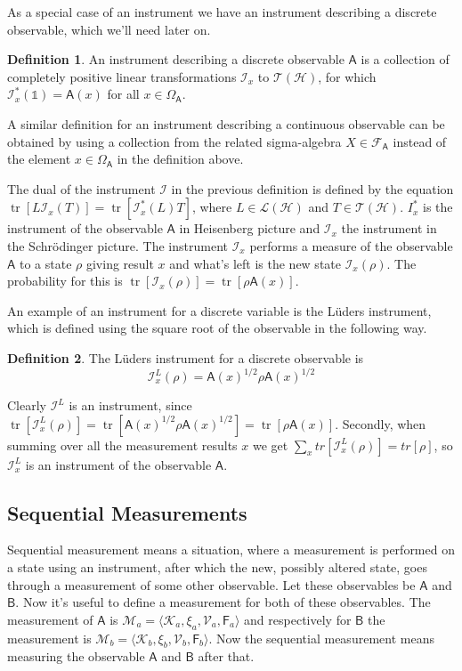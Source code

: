 \documentclass[a4paper,12pt]{wihuri}
\theoremstyle{definition}
\newtheorem{definition}{Definition}
\numberwithin{definition}{section}
\numberwithin{example}{section}
\numberwithin{theorem}{section}
\numberwithin{proposition}{section}
\numberwithin{lemma}{section}
\newcommand{\I}{\mathcal{I}}%
\newcommand{\hi}{\mathcal{H}}%
\newcommand{\ki}{\mathcal{K}}%
\newcommand{\salg}{\mathcal{F}}%
\newcommand{\tc}{\mathcal{T}}%
\newcommand{\mm}{\mathcal{M}}%
\newcommand{\V}{\mathcal{V}}%
\newcommand{\A}{\mathsf{A}}%
\newcommand{\B}{\mathsf{B}}%
\newcommand{\F}{\mathsf{F}}%
\newcommand{\id}{\mathds{1}}
\DeclareMathOperator{\tr}{tr}
\begin{document}
As a special case of an instrument we have an instrument describing a discrete observable, which we'll need later on.
\begin{definition}
An instrument describing a discrete observable $\A$ is a collection of completely positive linear transformations $\I_x$ to $\tc (\hi )$, for which $\I_x^* (\id ) = \A(x)$ for all $x \in \Omega_\A$.
\end{definition}
A similar definition for an instrument describing a continuous observable can be obtained by using a collection from the related sigma-algebra $X\in\salg_\A$ instead of the element $x\in\Omega_\A$ in the definition above. 


The dual of the instrument $\I$ in the previous definition is defined by the equation $\tr[L \I_x (T)] = \tr[\I_x^* (L)T]$, where $L \in \mathcal{L}(\hi)$ and $T \in \tc (\hi)$. $I_x^*$ is the instrument of the observable $\A$ in Heisenberg picture and $\I_x$ the instrument in the Schrödinger picture. The instrument $\I_x$ performs a measure of the observable $\A$ to a state $\rho$ giving result $x$ and what's left is the new state $\I_x(\rho)$. The probability for this is $\tr[\I_x(\rho)] = \tr[\rho \A(x)]$.

An example of an instrument for a discrete variable is the Lüders instrument, which is defined using the square root of the observable in the following way.

\begin{definition}
The Lüders instrument for a discrete observable is 
\begin{equation}
\I_x^L(\rho) = \A(x)^{1/2}\rho \A(x)^{1/2}
\end{equation}
\end{definition}
Clearly $\I^L$ is an instrument, since $\tr[\I_x^L(\rho)] = \tr[\A(x)^{1/2}\rho \A(x)^{1/2}] = \tr[\rho \A(x)]$. Secondly, when summing over all the measurement results $x$ we get $\sum_x tr[\I_x^L(\rho)] = tr[\rho]$, so $\I_x^L$ is an instrument of the observable $\A$.
 
\subsection{Sequential Measurements}
Sequential measurement means a situation, where a measurement is performed on a state using an instrument, after which the new, possibly altered state, goes through a measurement of some other observable. Let these observables be $\A$ and $\B$. Now it's useful to define a measurement for both of these observables. The measurement of  $\A$ is $\mm_a = \langle \ki_a , \xi_a , \V_a  , \F_a \rangle$ and respectively for $\B$ the measurement is $\mm_b = \langle \ki_b , \xi_b , \V_b  , \F_b \rangle$. Now the sequential measurement means measuring the observable $\A$ and $\B$ after that. 
\end{document}
